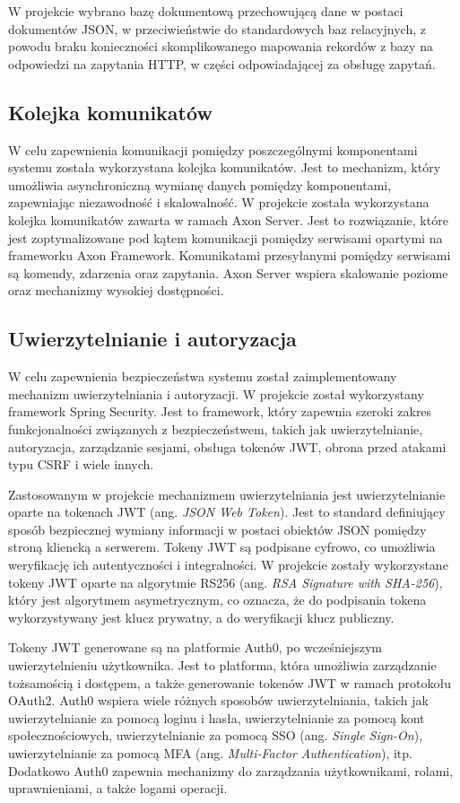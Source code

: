 W projekcie wybrano bazę dokumentową przechowującą dane w postaci dokumentów JSON, w przeciwieństwie do standardowych baz relacyjnych, z powodu braku konieczności skomplikowanego mapowania rekordów z bazy na odpowiedzi na zapytania HTTP, w części odpowiadającej za obsługę zapytań.

\subsection{Kolejka komunikatów}

W celu zapewnienia komunikacji pomiędzy poszczególnymi komponentami systemu została wykorzystana kolejka komunikatów. Jest to mechanizm, który umożliwia asynchroniczną wymianę danych pomiędzy komponentami, zapewniając niezawodność i skalowalność. W projekcie została wykorzystana kolejka komunikatów zawarta w ramach Axon Server. Jest to rozwiązanie, które jest zoptymalizowane pod kątem komunikacji pomiędzy serwisami opartymi na frameworku Axon Framework. Komunikatami przesyłanymi pomiędzy serwisami są komendy, zdarzenia oraz zapytania. Axon Server wspiera skalowanie poziome oraz mechanizmy wysokiej dostępności.

\subsection{Uwierzytelnianie i autoryzacja}

W celu zapewnienia bezpieczeństwa systemu został zaimplementowany mechanizm uwierzytelniania i autoryzacji. W projekcie został wykorzystany framework Spring Security. Jest to framework, który zapewnia szeroki zakres funkcjonalności związanych z bezpieczeństwem, takich jak uwierzytelnianie, autoryzacja, zarządzanie sesjami, obsługa tokenów JWT, obrona przed atakami typu CSRF i wiele innych.

Zastosowanym w projekcie mechanizmem uwierzytelniania jest uwierzytelnianie oparte na tokenach JWT (ang. \textit{JSON Web Token}). Jest to standard definiujący sposób bezpiecznej wymiany informacji w postaci obiektów JSON pomiędzy stroną kliencką a serwerem. Tokeny JWT są podpisane cyfrowo, co umożliwia weryfikację ich autentyczności i integralności. W projekcie zostały wykorzystane tokeny JWT oparte na algorytmie RS256 (ang. \textit{RSA Signature with SHA-256}), który jest algorytmem asymetrycznym, co oznacza, że do podpisania tokena wykorzystywany jest klucz prywatny, a do weryfikacji klucz publiczny.

Tokeny JWT generowane są na platformie Auth0, po wcześniejszym uwierzytelnieniu użytkownika. Jest to platforma, która umożliwia zarządzanie tożsamością i dostępem, a także generowanie tokenów JWT w ramach protokołu OAuth2. Auth0 wspiera wiele różnych sposobów uwierzytelniania, takich jak uwierzytelnianie za pomocą loginu i hasła, uwierzytelnianie za pomocą kont społecznościowych, uwierzytelnianie za pomocą SSO (ang. \textit{Single Sign-On}), uwierzytelnianie za pomocą MFA (ang. \textit{Multi-Factor Authentication}), itp. Dodatkowo Auth0 zapewnia mechanizmy do zarządzania użytkownikami, rolami, uprawnieniami, a także logami operacji.

